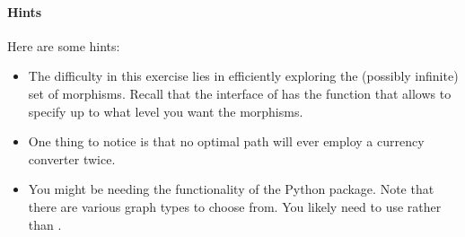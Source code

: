 \paragraph{Hints} Here are some hints:
\begin{itemize}
\item The difficulty in this exercise lies in efficiently exploring the (possibly infinite) set of morphisms.
Recall that the interface of  has the function  that allows to specify up to what level you want the morphisms.

\item  One thing to notice is that no optimal path will ever employ a currency converter twice.

\item  You might be needing the functionality of the  Python package. Note that there are various graph types to choose from. You likely need to use  rather than .
\end{itemize}
